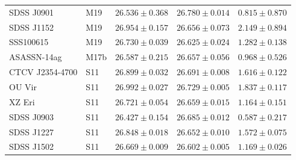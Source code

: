 \begin{table}
\begin{tabular}{llccc}
        SDSS J0901      &  M19      & $26.536 \pm 0.368$    & $26.780 \pm 0.014$    & $0.815 \pm 0.870$ \\
        SDSS J1152      &  M19      & $26.954 \pm 0.157$    & $26.656 \pm 0.073$    & $2.149 \pm 0.894$ \\
        SSS100615       &  M19      & $26.730 \pm 0.039$    & $26.625 \pm 0.024$    & $1.282 \pm 0.138$ \\
        ASASSN-14ag     &  M17b     & $26.587 \pm 0.215$    & $26.657 \pm 0.056$    & $0.968 \pm 0.526$ \\
        CTCV J2354-4700 &  S11      & $26.899 \pm 0.032$    & $26.691 \pm 0.008$    & $1.616 \pm 0.122$ \\
        OU Vir          &  S11      & $26.992 \pm 0.027$    & $26.729 \pm 0.005$    & $1.837 \pm 0.117$ \\
        XZ Eri          &  S11      & $26.721 \pm 0.054$    & $26.659 \pm 0.015$    & $1.164 \pm 0.151$ \\
        SDSS J0903      &  S11      & $26.427 \pm 0.154$    & $26.685 \pm 0.012$    & $0.587 \pm 0.217$ \\
        SDSS J1227      &  S11      & $26.848 \pm 0.018$    & $26.652 \pm 0.010$    & $1.572 \pm 0.075$ \\
        SDSS J1502      &  S11      & $26.669 \pm 0.009$    & $26.602 \pm 0.005$    & $1.169 \pm 0.026$ \\

\end{tabular}
\end{table}
